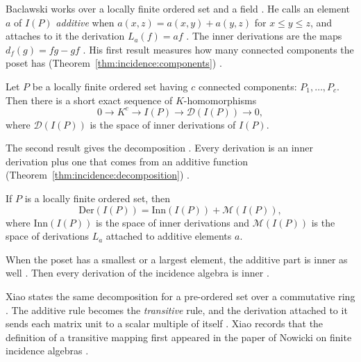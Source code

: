 Baclawski works over a locally finite ordered set and a field
\cite[p.~351]{Baclawski1972}. He calls an element $a$ of $I(P)$
\emph{additive} when $a(x,z)=a(x,y)+a(y,z)$ for $x\le y\le z$, and attaches to
it the derivation $L_{a}(f)=af$ \cite[p.~352]{Baclawski1972}. The inner
derivations are the maps $d_{f}(g)=fg-gf$ \cite[p.~352]{Baclawski1972}. His
first result measures how many connected components the poset has
(Theorem~\ref{thm:incidence:components}) \cite[p.~352]{Baclawski1972}.

\begin{theorem}\label{thm:incidence:components}
Let $P$ be a locally finite ordered set having $c$ connected components:
$P_{1},\dots,P_{c}$. Then there is a short exact sequence of $K$-homomorphisms
\begin{equation*}
0\longrightarrow K^{c}\longrightarrow I(P)\longrightarrow
\mathcal D(I(P))\longrightarrow 0,
\end{equation*}
where $\mathcal D(I(P))$ is the space of inner derivations of $I(P)$.
\end{theorem}

The second result gives the decomposition \cite[p.~352]{Baclawski1972}. Every
derivation is an inner derivation plus one that comes from an additive function (Theorem~\ref{thm:incidence:decomposition})
\cite[p.~352]{Baclawski1972}.\begin{theorem}\label{thm:incidence:decomposition}
If $P$ is a locally finite ordered set, then
\begin{equation*}
\mathrm{Der}(I(P))=\mathrm{Inn}(I(P))+\mathcal M(I(P)),
\end{equation*}
where $\mathrm{Inn}(I(P))$ is the space of inner derivations and
$\mathcal M(I(P))$ is the space of derivations $L_{a}$ attached to additive
elements $a$.
\end{theorem}

When the poset has a smallest or a largest element, the additive part is inner
as well \cite[p.~354]{Baclawski1972}. Then every derivation of the incidence
algebra is inner \cite[p.~354]{Baclawski1972}.

Xiao states the same decomposition for a pre-ordered set over a commutative
ring \cite[p.~1362]{Xiao2015}. The additive rule becomes the \emph{transitive}
rule, and the derivation attached to it sends each matrix unit to a scalar
multiple of itself \cite[p.~1362]{Xiao2015}. Xiao records that the definition
of a transitive mapping first appeared in the paper of Nowicki on finite
incidence algebras \cite[Remark~2.4, p.~1362]{Xiao2015}.

